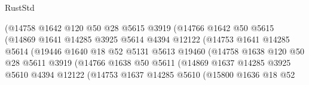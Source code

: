 \begin{lexlean}{RustStd}
\begin{coremodule}
                                (@14758
                                  @1642
                                  @120
                                  @50
                                  @28
                                  @5615
                                  @3919
                                  (@14766
                                    @1642
                                    @50
                                    @5615
                                    (@14869
                                      @1641
                                      @14285
                                      @3925
                                      @5614
                                      @4394
                                      @12122
                                      (@14753
                                        @1641
                                        @14285
                                        @5614
                                        (@19446
                                          @1640
                                          @18
                                          @52
                                          @5131
                                          @5613
                                          @19460
                                          (@14758
                                            @1638
                                            @120
                                            @50
                                            @28
                                            @5611
                                            @3919
                                            (@14766
                                              @1638
                                              @50
                                              @5611
                                              (@14869
                                                @1637
                                                @14285
                                                @3925
                                                @5610
                                                @4394
                                                @12122
                                                (@14753
                                                  @1637
                                                  @14285
                                                  @5610
                                                  (@15800
                                                    @1636
                                                    @18
                                                    @52

\end{coremodule}
\end{lexlean}
